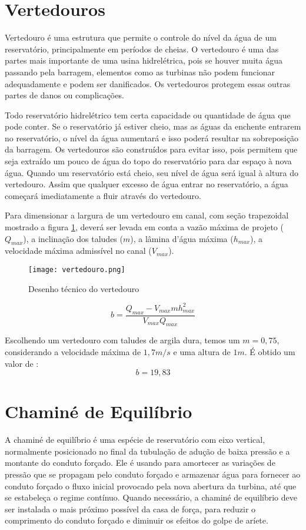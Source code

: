 \section{Vertedouros}
Vertedouro é uma estrutura que permite o controle do nível da água de um reservatório, principalmente em períodos de cheias.  O vertedouro é uma das partes mais importante de uma usina hidrelétrica, pois se houver muita água passando pela barragem, elementos como as turbinas não podem funcionar adequadamente e podem ser danificados. Os vertedouros protegem essas outras partes de danos ou complicações.

Todo reservatório hidrelétrico tem certa capacidade ou quantidade de água que pode conter. Se o reservatório já estiver cheio, mas as águas da enchente entrarem no reservatório, o nível da água aumentará e isso poderá resultar na sobreposição da barragem. Os vertedouros são construídos para evitar isso, pois permitem que seja extraído um pouco de água do topo do reservatório para dar espaço à nova água. Quando um reservatório está cheio, seu nível de água será igual à altura do vertedouro. Assim que qualquer excesso de água entrar no reservatório, a água começará imediatamente a fluir através do vertedouro.

Para dimensionar a largura de um vertedouro em canal, com seção trapezoidal mostrado a figura \ref{fig:vertedouro}, deverá ser levada em conta a vazão máxima de projeto ($Q_{max}$), a inclinação dos taludes ($m$), a lâmina d’água máxima ($h_{max}$), a velocidade máxima admissível no canal ($V_{max}$).

\begin{figure}[h]
	\centering
	\texttt{[image: vertedouro.png]}
	\caption{Desenho técnico do vertedouro}
	\label{fig:vertedouro}
\end{figure}

\begin{equation}
b = \dfrac{Q_{max}-V_{max}mh^2_{max}}{V_{max}Q_{max}}
\end{equation}

Escolhendo um vertedouro com taludes de argila dura, temos um $m=0,75$, considerando a velocidade máxima de $1,7m/s$ e uma altura de $1m$. É obtido um valor de :
\begin{equation}
	b=19,83
\end{equation}

\section{Chaminé de Equilíbrio}
A chaminé de equilíbrio é uma espécie de reservatório com eixo vertical, normalmente posicionado no final da tubulação de adução de baixa pressão e a montante do conduto forçado.  Ele é usando para amortecer as variações de pressão que se propagam pelo conduto forçado e armazenar água para fornecer ao conduto forçado o fluxo inicial provocado pela nova abertura da turbina, até que se estabeleça o regime contínuo. Quando necessário, a chaminé de equilíbrio deve ser instalada o mais próximo possível da casa de força, para reduzir o comprimento do conduto forçado e diminuir os efeitos do golpe de aríete.

